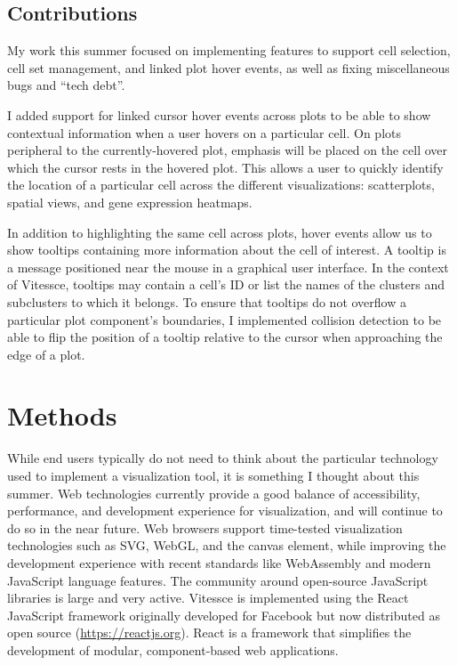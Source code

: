 \documentclass[12pt, letterpaper]{article}
\begin{document}


\subsection{Contributions}
My work this summer focused on implementing features to support cell selection, cell set management, and linked plot hover events, as well as fixing miscellaneous bugs and ``tech debt''.






I added support for linked cursor hover events across plots to be able to show contextual information when a user hovers on a particular cell.
On plots peripheral to the currently-hovered plot, emphasis will be placed on the cell over which the cursor rests in the hovered plot.
This allows a user to quickly identify the location of a particular cell across the different visualizations: scatterplots, spatial views, and gene expression heatmaps.

In addition to highlighting the same cell across plots, hover events allow us to show tooltips containing more information about the cell of interest.
A tooltip is a message positioned near the mouse in a graphical user interface.
In the context of Vitessce, tooltips may contain a cell's ID or list the names of the clusters and subclusters to which it belongs.
To ensure that tooltips do not overflow a particular plot component's boundaries, I implemented collision detection to be able to flip the position of a tooltip relative to the cursor when approaching the edge of a plot.


\section{Methods}
While end users typically do not need to think about the particular technology used to implement a visualization tool, it is something I thought about this summer.
Web technologies currently provide a good balance of accessibility, performance, and development experience for visualization, and will continue to do so in the near future.
Web browsers support time-tested visualization technologies such as SVG, WebGL, and the canvas element, while improving the development experience with recent standards like WebAssembly and modern JavaScript language features.
The community around open-source JavaScript libraries is large and very active.
Vitessce is implemented using the React JavaScript framework originally developed for Facebook but now distributed as open source (\url{https://reactjs.org}).
React is a framework that simplifies the development of modular, component-based web applications.
\end{document}
